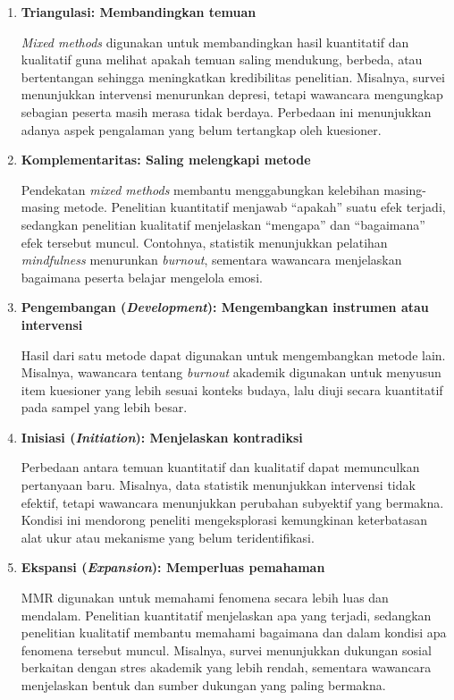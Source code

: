 \documentclass[
  indonesian,
  letterpaper,
  DIV=11,
  numbers=noendperiod]{scrreprt}
\begin{document}
\begin{enumerate}
\def\labelenumi{\arabic{enumi}.}
\item
  \textbf{Triangulasi: Membandingkan temuan}

  \emph{Mixed methods} digunakan untuk membandingkan hasil kuantitatif
  dan kualitatif guna melihat apakah temuan saling mendukung, berbeda,
  atau bertentangan sehingga meningkatkan kredibilitas penelitian.
  Misalnya, survei menunjukkan intervensi menurunkan depresi, tetapi
  wawancara mengungkap sebagian peserta masih merasa tidak berdaya.
  Perbedaan ini menunjukkan adanya aspek pengalaman yang belum
  tertangkap oleh kuesioner.
\item
  \textbf{Komplementaritas: Saling melengkapi metode}

  Pendekatan \emph{mixed methods} membantu menggabungkan kelebihan
  masing-masing metode. Penelitian kuantitatif menjawab ``apakah'' suatu
  efek terjadi, sedangkan penelitian kualitatif menjelaskan ``mengapa''
  dan ``bagaimana'' efek tersebut muncul. Contohnya, statistik
  menunjukkan pelatihan \emph{mindfulness} menurunkan \emph{burnout},
  sementara wawancara menjelaskan bagaimana peserta belajar mengelola
  emosi.
\item
  \textbf{Pengembangan (\emph{Development}): Mengembangkan instrumen
  atau intervensi}

  Hasil dari satu metode dapat digunakan untuk mengembangkan metode
  lain. Misalnya, wawancara tentang \emph{burnout} akademik digunakan
  untuk menyusun item kuesioner yang lebih sesuai konteks budaya, lalu
  diuji secara kuantitatif pada sampel yang lebih besar.
\item
  \textbf{Inisiasi (\emph{Initiation}): Menjelaskan kontradiksi}

  Perbedaan antara temuan kuantitatif dan kualitatif dapat memunculkan
  pertanyaan baru. Misalnya, data statistik menunjukkan intervensi tidak
  efektif, tetapi wawancara menunjukkan perubahan subyektif yang
  bermakna. Kondisi ini mendorong peneliti mengeksplorasi kemungkinan
  keterbatasan alat ukur atau mekanisme yang belum teridentifikasi.
\item
  \textbf{Ekspansi (\emph{Expansion}): Memperluas pemahaman}

  MMR digunakan untuk memahami fenomena secara lebih luas dan mendalam.
  Penelitian kuantitatif menjelaskan apa yang terjadi, sedangkan
  penelitian kualitatif membantu memahami bagaimana dan dalam kondisi
  apa fenomena tersebut muncul. Misalnya, survei menunjukkan dukungan
  sosial berkaitan dengan stres akademik yang lebih rendah, sementara
  wawancara menjelaskan bentuk dan sumber dukungan yang paling bermakna.
\end{enumerate}
\end{document}
